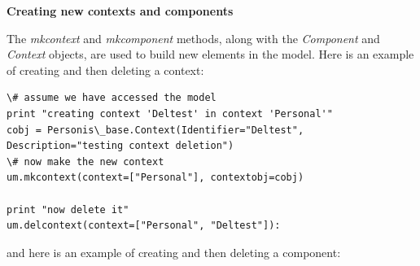 \documentclass[letterpaper,10pt,english]{sphinxmanual}
\begin{document}
\textbf{Creating new contexts and components}

The \emph{mkcontext} and \emph{mkcomponent} methods, along with the \emph{Component} and \emph{Context} objects, are used to build
new elements in the model. Here is an example of creating and then deleting a context:

\begin{Verbatim}[commandchars=\\\{\}]
\# assume we have accessed the model
print "creating context 'Deltest' in context 'Personal'"
cobj = Personis\_base.Context(Identifier="Deltest", Description="testing context deletion")
\# now make the new context
um.mkcontext(context=["Personal"], contextobj=cobj)

print "now delete it"
um.delcontext(context=["Personal", "Deltest"]):
\end{Verbatim}

and here is an example of creating and then deleting a component:
\end{document}
